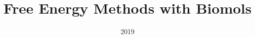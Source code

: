 \documentclass[publish]{ethdissertation}
\title{Free Energy Methods with Biomols}
\author{\textls{Benjamin Joachim Ries}}
\date{2019}
\begin{document}
 \frontmatter
 
 
 \maketitle
 
 \dedication{Here a nice dedication}

 

 \tableofcontents

 
 
 

 \mainmatter







 
 \backmatter
  

 
\end{document}
